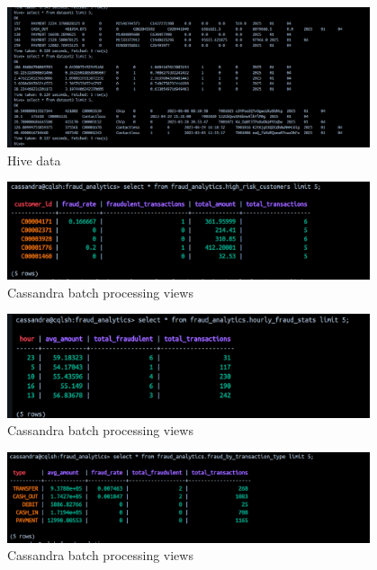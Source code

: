 \documentclass[12pt,a4paper, hidelinks]{article}
\begin{document}
\begin{figure}[h!]
  \centering
  \includegraphics[width=0.95\textwidth]{images/m3-hive-tables.png}
  \caption{Hive data}
  \label{fig:hive1}
\end{figure}



\begin{figure}[h!]
  \centering
  \includegraphics[width=0.95\textwidth]{images/m3-cassandra-batch-1.png}
  \caption{Cassandra batch processing views}
  \label{fig:cassandra-batch-1}
\end{figure}

\begin{figure}[h!]
  \centering
  \includegraphics[width=0.95\textwidth]{images/m3-cassandra-batch-2.png}
  \caption{Cassandra batch processing views}
  \label{fig:cassandra-batch-2}
\end{figure}

\begin{figure}[h!]
  \centering
  \includegraphics[width=0.95\textwidth]{images/m3-cassandra-batch-3.png}
  \caption{Cassandra batch processing views}
  \label{fig:cassandra-batch-3}
\end{figure}
\end{document}
